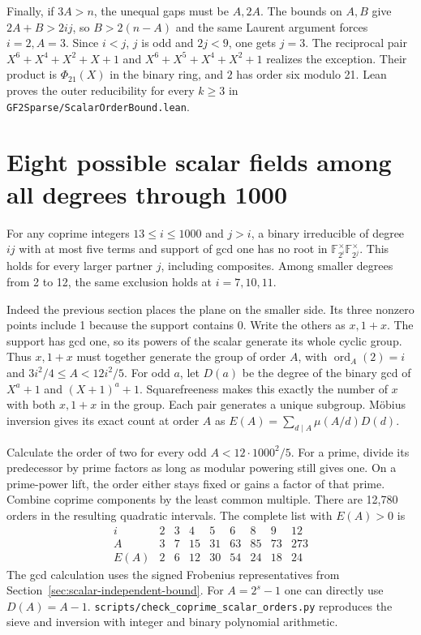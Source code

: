 \documentclass[11pt]{article}
\newcommand{\ord}{\operatorname{ord}}
\begin{document}
Finally, if \(3A>n\), the unequal gaps must be \(A,2A\).
The bounds on \(A,B\) give \(2A+B>2ij\), so \(B>2(n-A)\)
and the same Laurent argument forces \(i=2,A=3\). Since \(i<j\),
\(j\) is odd and \(2j<9\), one gets \(j=3\).
The reciprocal pair \(X^6+X^4+X^2+X+1\) and
\(X^6+X^5+X^4+X^2+1\) realizes the exception. Their product is
\(\Phi_{21}(X)\) in the binary ring, and \(2\) has order six modulo 21.
Lean proves the outer reducibility for every \(k\ge3\) in
\nolinkurl{GF2Sparse/ScalarOrderBound.lean}.

\clearpage
\section{Eight possible scalar fields among all degrees through 1000}
\label{sec:scalar-composite-census}
For any coprime integers \(13\le i\le1000\) and \(j>i\), a binary
irreducible of degree \(ij\) with at most five terms and support of
gcd one has no root in
\(\mathbb F_{2^i}^{\times}\mathbb F_{2^j}^{\times}\).
This holds for every larger partner \(j\), including composites.
Among smaller degrees from 2 to 12, the same exclusion holds at
\(i=7,10,11\).

Indeed the previous section places the plane on the smaller side.
Its three nonzero points include 1 because the support contains 0.
Write the others as \(x,1+x\). The support has gcd one, so its
powers of the scalar generate its whole cyclic group.
Thus \(x,1+x\) must together generate the group of order \(A\),
with \(\ord_A(2)=i\) and \(3i^2/4\le A<12i^2/5\).
For odd \(a\), let \(D(a)\) be the degree of the binary gcd of
\(X^a+1\) and \((X+1)^a+1\). Squarefreeness makes this exactly
the number of \(x\) with both \(x,1+x\) in the group. Each pair
generates a unique subgroup. M\"obius inversion gives its exact count
at order \(A\) as \(E(A)=\sum_{d\mid A}\mu(A/d)D(d)\).

Calculate the order of two for every odd \(A<12\cdot1000^2/5\).
For a prime, divide its predecessor by prime factors as long as
modular powering still gives one. On a prime-power lift, the order
either stays fixed or gains a factor of that prime. Combine coprime
components by the least common multiple. There are 12,780 orders in
the resulting quadratic intervals. The complete list with \(E(A)>0\)
is
\[
\begin{array}{c|rrrrrrrr}
 i&2&3&4&5&6&8&9&12\\
 A&3&7&15&31&63&85&73&273\\
 E(A)&2&6&12&30&54&24&18&24
\end{array}
\]
The gcd calculation uses the signed Frobenius representatives from
Section~\ref{sec:scalar-independent-bound}. For \(A=2^s-1\)
one can directly use \(D(A)=A-1\).
\nolinkurl{scripts/check_coprime_scalar_orders.py} reproduces the
sieve and inversion with integer and binary polynomial arithmetic.
\end{document}
